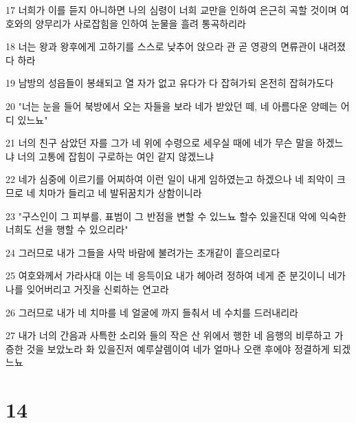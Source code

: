 \par 17 너희가 이를 듣지 아니하면 나의 심령이 너희 교만을 인하여 은근히 곡할 것이며 여호와의 양무리가 사로잡힘을 인하여 눈물을 흘려 통곡하리라
\par 18 너는 왕과 왕후에게 고하기를 스스로 낮추어 앉으라 관 곧 영광의 면류관이 내려졌다 하라
\par 19 남방의 성읍들이 봉쇄되고 열 자가 없고 유다가 다 잡혀가되 온전히 잡혀가도다
\par 20 "너는 눈을 들어 북방에서 오는 자들을 보라 네가 받았던 떼, 네 아름다운 양떼는 어디 있느뇨"
\par 21 너의 친구 삼았던 자를 그가 네 위에 수령으로 세우실 때에 네가 무슨 말을 하겠느냐 너의 고통에 잡힘이 구로하는 여인 같지 않겠느냐
\par 22 네가 심중에 이르기를 어찌하여 이런 일이 내게 임하였는고 하겠으나 네 죄악이 크므로 네 치마가 들리고 네 발뒤꿈치가 상함이니라
\par 23 "구스인이 그 피부를, 표범이 그 반점을 변할 수 있느뇨 할수 있을진대 악에 익숙한 너희도 선을 행할 수 있으리라"
\par 24 그러므로 내가 그들을 사막 바람에 불려가는 초개같이 흩으리로다
\par 25 여호와께서 가라사대 이는 네 응득이요 내가 헤아려 정하여 네게 준 분깃이니 네가 나를 잊어버리고 거짓을 신뢰하는 연고라
\par 26 그러므로 내가 네 치마를 네 얼굴에 까지 들춰서 네 수치를 드러내리라
\par 27 내가 너의 간음과 사특한 소리와 들의 작은 산 위에서 행한 네 음행의 비루하고 가증한 것을 보았노라 화 있을진저 예루살렘이여 네가 얼마나 오랜 후에야 정결하게 되겠느뇨

\chapter{14}

